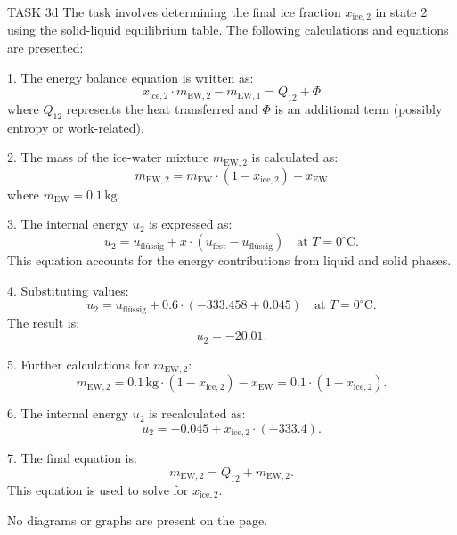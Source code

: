 TASK 3d  
The task involves determining the final ice fraction \( x_{\text{ice},2} \) in state 2 using the solid-liquid equilibrium table. The following calculations and equations are presented:

1. The energy balance equation is written as:  
\[
x_{\text{ice},2} \cdot m_{\text{EW},2} - m_{\text{EW},1} = Q_{12} + \Phi
\]  
where \( Q_{12} \) represents the heat transferred and \( \Phi \) is an additional term (possibly entropy or work-related).

2. The mass of the ice-water mixture \( m_{\text{EW},2} \) is calculated as:  
\[
m_{\text{EW},2} = m_{\text{EW}} \cdot \left( 1 - x_{\text{ice},2} \right) - x_{\text{EW}}
\]  
where \( m_{\text{EW}} = 0.1 \, \text{kg} \).

3. The internal energy \( u_2 \) is expressed as:  
\[
u_2 = u_{\text{flüssig}} + x \cdot \left( u_{\text{fest}} - u_{\text{flüssig}} \right) \quad \text{at } T = 0^\circ\text{C}.
\]  
This equation accounts for the energy contributions from liquid and solid phases.

4. Substituting values:  
\[
u_2 = u_{\text{flüssig}} + 0.6 \cdot \left( -333.458 + 0.045 \right) \quad \text{at } T = 0^\circ\text{C}.
\]  
The result is:  
\[
u_2 = -20.01.
\]

5. Further calculations for \( m_{\text{EW},2} \):  
\[
m_{\text{EW},2} = 0.1 \, \text{kg} \cdot \left( 1 - x_{\text{ice},2} \right) - x_{\text{EW}} = 0.1 \cdot \left( 1 - x_{\text{ice},2} \right).
\]

6. The internal energy \( u_2 \) is recalculated as:  
\[
u_2 = -0.045 + x_{\text{ice},2} \cdot \left( -333.4 \right).
\]

7. The final equation is:  
\[
m_{\text{EW},2} = Q_{12} + m_{\text{EW},2}.
\]  
This equation is used to solve for \( x_{\text{ice},2} \).

No diagrams or graphs are present on the page.